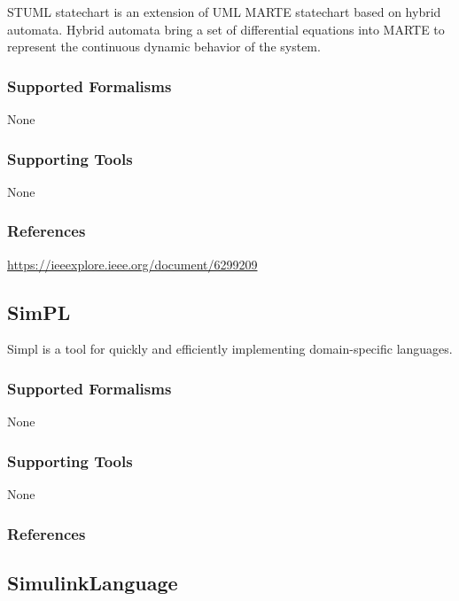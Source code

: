 STUML statechart is an extension of UML MARTE statechart based on hybrid automata. 
Hybrid automata bring a set of differential equations into MARTE to represent the continuous dynamic behavior of the system.

\subsubsection{Supported Formalisms}

None


\subsubsection{Supporting Tools}

None


\subsubsection{References}

\url{https://ieeexplore.ieee.org/document/6299209}



\subsection{SimPL}
\label{subsecL:SimPL}


Simpl is a tool for quickly and efficiently implementing domain-specific languages.

\subsubsection{Supported Formalisms}

None


\subsubsection{Supporting Tools}

None


\subsubsection{References}





\subsection{SimulinkLanguage}
\label{subsecL:SimulinkLanguage}

